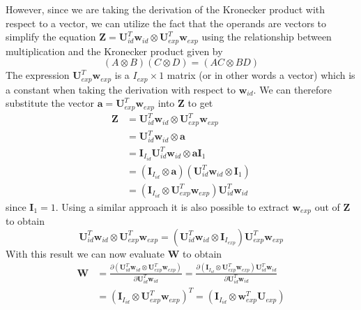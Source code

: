 \documentclass[11pt,a4paper]{report}
\begin{document}
However, since we are taking the derivation of the Kronecker product with
respect to a vector, we can utilize the fact that the operands are vectors to simplify the equation $\mathbf{Z} =
\mathbf{U}_{id}^T\mathbf{w}_{id} \otimes
\mathbf{U}_{exp}^T\mathbf{w}_{exp}$ using the relationship between
multiplication and the Kronecker product given by 
\begin{equation*}
(A \otimes B)(C \otimes D) = (AC \otimes BD)
\end{equation*}
The expression $\mathbf{U}_{exp}^T\mathbf{w}_{exp}$ is a $I_{exp} \times
1$ matrix (or in other words a vector) which is a constant when
taking the derivation with respect to $\mathbf{w}_{id}$. We can therefore
substitute the vector $\mathbf{a} = \mathbf{U}_{exp}^T\mathbf{w}_{exp}$ into $\mathbf{Z}$
to get 
\begin{align}
\mathbf{Z} &= \mathbf{U}_{id}^T\mathbf{w}_{id} \otimes
\mathbf{U}_{exp}^T\mathbf{w}_{exp}\nonumber\\
& = \mathbf{U}_{id}^T\mathbf{w}_{id} \otimes
\mathbf{a}\nonumber\\
&= \mathbf{I}_{I_{id}}\mathbf{U}_{id}^T\mathbf{w}_{id} \otimes
\mathbf{a}\mathbf{I}_1 \nonumber\\
&= (\mathbf{I}_{I_{id}} \otimes \mathbf{a})(\mathbf{U}_{id}^T\mathbf{w}_{id}
\otimes \mathbf{I}_1)\nonumber\\
\label{eq:opt1}
&=(\mathbf{I}_{I_{id}} \otimes \mathbf{U}_{exp}^T\mathbf{w}_{exp})\mathbf{U}_{id}^T\mathbf{w}_{id}
\end{align}
since $\mathbf{I}_1 = 1$. Using a similar approach it is also possible to extract
$\mathbf{w}_{exp}$ out of $\mathbf{Z}$ to obtain
\begin{equation}\label{eq:opt2}
\mathbf{U}_{id}^T\mathbf{w}_{id} \otimes
\mathbf{U}_{exp}^T\mathbf{w}_{exp} = (\mathbf{U}_{id}^T\mathbf{w}_{id} \otimes
\mathbf{I}_{I_{exp}})\mathbf{U}_{exp}^T\mathbf{w}_{exp} 
\end{equation}
With this result we can now evaluate $\mathbf{W}$ to obtain
\begin{align*}
\mathbf{W} &= 
\frac
{\partial
(\mathbf{U}_{id}^T\mathbf{w}_{id} \otimes \mathbf{U}_{exp}^T\mathbf{w}_{exp})
}
{\partial
\mathbf{U}_{id}^T\mathbf{w}_{id}
}= 
\frac
{\partial
(\mathbf{I}_{I_{id}} \otimes \mathbf{U}_{exp}^T\mathbf{w}_{exp})\mathbf{U}_{id}^T\mathbf{w}_{id}
}
{\partial
\mathbf{U}_{id}^T\mathbf{w}_{id}
}\\
&=(\mathbf{I}_{I_{id}} \otimes
\mathbf{U}_{exp}^T\mathbf{w}_{exp})^T =(\mathbf{I}_{I_{id}} \otimes
\mathbf{w}_{exp}^T\mathbf{U}_{exp})
\end{align*}
\end{document}
